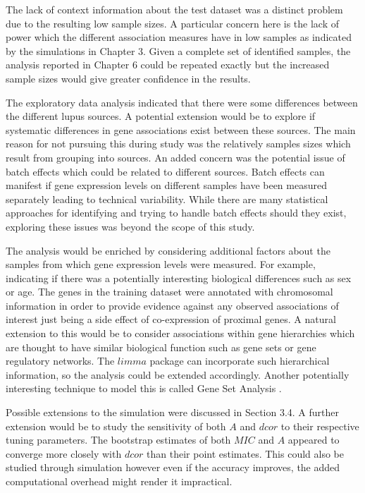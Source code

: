 \documentclass[a4paper, 12pt]{report}
\begin{document}
The lack of context information about the test dataset was a distinct problem due to the resulting low sample sizes. A particular concern here is the lack of power which the different association measures have in low samples as indicated by the simulations in Chapter 3. Given a complete set of identified samples, the analysis reported in Chapter 6 could be repeated exactly but the increased sample sizes would give greater confidence in the results.

The exploratory data analysis indicated that there were some differences between the different lupus sources. A potential extension would be to explore if systematic differences in gene associations exist between these sources. The main reason for not pursuing this during study was the relatively samples sizes which result from grouping into sources. An added concern was the potential issue of batch effects which could be related to different sources. Batch effects can manifest if gene expression levels on different samples have been measured separately leading to technical variability. While there are many statistical approaches for identifying and trying to handle batch effects should they exist, exploring these issues was beyond the scope of this study.

The analysis would  be enriched by considering additional factors about the samples from which gene expression levels were measured. For example, indicating if there was a potentially interesting biological differences such as sex or age. The genes in the training dataset were annotated with chromosomal information in order to provide evidence against any observed associations of interest just being a side effect of co-expression of proximal genes. A natural extension to this would be to consider associations within gene hierarchies which are thought to have similar biological function such as gene sets or gene regulatory networks. The $limma$ package can incorporate such hierarchical information, so the analysis could be extended accordingly. Another potentially interesting technique to model this is called Gene Set Analysis \cite{efron2007}.

Possible extensions to the simulation were discussed in Section 3.4. A further extension would be to study the sensitivity of both $A$ and $dcor$ to their respective tuning parameters. The bootstrap estimates of both $MIC$ and $A$ appeared to converge more closely with $dcor$ than their point estimates. This could also be studied through simulation however even if the accuracy improves, the added computational overhead might render it impractical.
\end{document}
